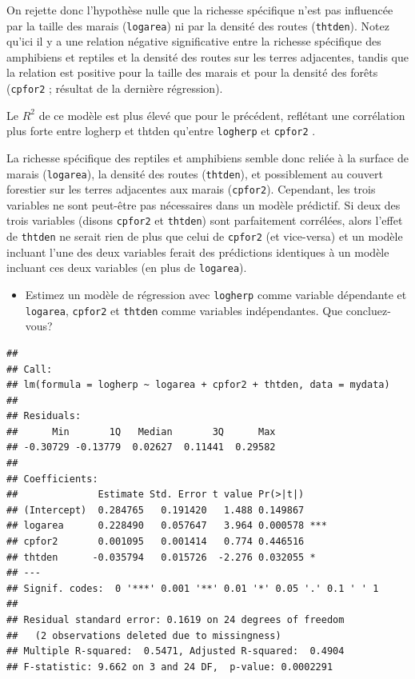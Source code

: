 \documentclass[
  12pt,
]{book}
\providecommand{\tightlist}{%
  \setlength{\itemsep}{0pt}\setlength{\parskip}{0pt}}
\begin{document}
On rejette donc l'hypothèse nulle que la richesse spécifique n'est pas influencée par la taille des marais (\texttt{logarea}) ni par la densité des routes (\texttt{thtden}). Notez qu'ici il y a une relation négative significative entre la richesse spécifique des amphibiens et reptiles et la densité des routes sur les terres adjacentes, tandis que la relation est positive pour la taille des marais et pour la densité des forêts (\texttt{cpfor2} ; résultat de la dernière régression).

Le \(R^2\) de ce modèle est plus élevé que pour le précédent, reflétant une corrélation plus forte entre logherp et thtden qu'entre \texttt{logherp} et \texttt{cpfor2} .

La richesse spécifique des reptiles et amphibiens semble donc reliée à la surface de marais (\texttt{logarea}), la densité des routes (\texttt{thtden}), et possiblement au couvert forestier sur les terres adjacentes aux marais (\texttt{cpfor2}). Cependant, les trois variables ne sont peut-être pas nécessaires dans un modèle prédictif. Si deux des trois variables (disons \texttt{cpfor2} et \texttt{thtden}) sont parfaitement corrélées, alors l'effet de \texttt{thtden} ne serait rien de plus que celui de \texttt{cpfor2} (et vice-versa) et un modèle incluant l'une des deux variables ferait des prédictions identiques à un modèle incluant ces deux variables (en plus de \texttt{logarea}).

\begin{itemize}
\tightlist
\item
  Estimez un modèle de régression avec \texttt{logherp} comme variable dépendante et \texttt{logarea}, \texttt{cpfor2} et \texttt{thtden} comme variables indépendantes. Que concluez-vous?
\end{itemize}

\begin{verbatim}
## 
## Call:
## lm(formula = logherp ~ logarea + cpfor2 + thtden, data = mydata)
## 
## Residuals:
##      Min       1Q   Median       3Q      Max 
## -0.30729 -0.13779  0.02627  0.11441  0.29582 
## 
## Coefficients:
##              Estimate Std. Error t value Pr(>|t|)    
## (Intercept)  0.284765   0.191420   1.488 0.149867    
## logarea      0.228490   0.057647   3.964 0.000578 ***
## cpfor2       0.001095   0.001414   0.774 0.446516    
## thtden      -0.035794   0.015726  -2.276 0.032055 *  
## ---
## Signif. codes:  0 '***' 0.001 '**' 0.01 '*' 0.05 '.' 0.1 ' ' 1
## 
## Residual standard error: 0.1619 on 24 degrees of freedom
##   (2 observations deleted due to missingness)
## Multiple R-squared:  0.5471, Adjusted R-squared:  0.4904 
## F-statistic: 9.662 on 3 and 24 DF,  p-value: 0.0002291
\end{verbatim}
\end{document}
